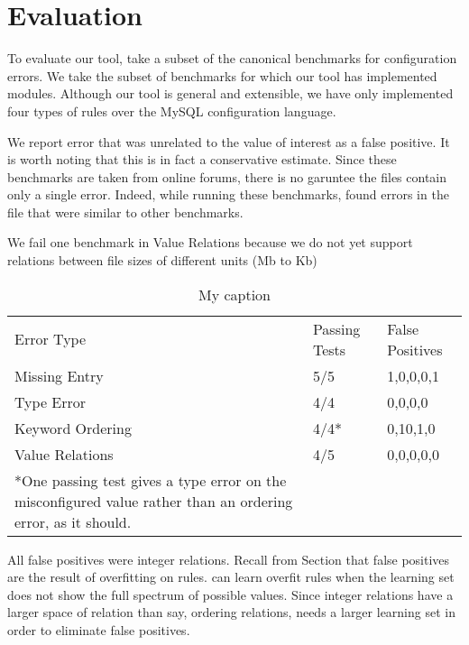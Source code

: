 \section{Evaluation}

To evaluate our tool, take a subset of the canonical benchmarks for configuration errors\cite{dataset}.
We take the subset of benchmarks for which our tool has implemented modules.
Although our tool is general and extensible, we have only implemented four types of rules over the MySQL configuration language.

We report error that was unrelated to the value of interest as a false positive.
It is worth noting that this is in fact a conservative estimate.
Since these benchmarks are taken from online forums, there is no garuntee the files contain only a single error.
Indeed, while running these benchmarks, \app found errors in the file that were similar to other benchmarks. 

We fail one benchmark in Value Relations because we do not yet support relations between file sizes of different units (Mb to Kb)

\begin{table}[]
\centering
\caption{My caption}
\label{my-label}
\begin{tabular}{lll}
Error Type       & Passing Tests & False Positives  \\
Missing Entry    & 5/5           & 1,0,0,0,1        \\
Type Error       & 4/4           & 0,0,0,0          \\
Keyword Ordering & 4/4*          & 0,10,1,0         \\
Value Relations  & 4/5           & 0,0,0,0,0        \\
*One passing test gives a type error on the misconfigured value rather than an ordering error, as it should.
\end{tabular}
\end{table}

All false positives were integer relations.
Recall from Section \sec{} that false positives are the result of overfitting on rules.
\app can learn overfit rules when the learning set does not show the full spectrum of possible values.
Since integer relations have a larger space of relation than say, ordering relations, \app needs a larger learning set in order to eliminate false positives.
